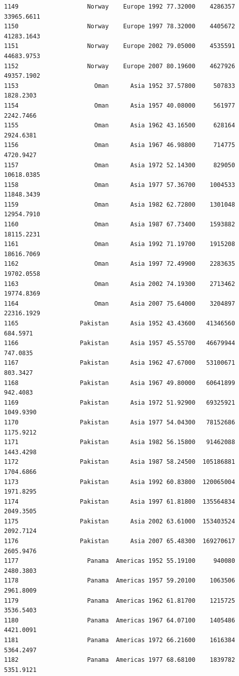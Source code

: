 \documentclass[
  letterpaper,
  DIV=11,
  numbers=noendperiod]{scrreprt}
\begin{document}
\begin{verbatim}
1149                   Norway    Europe 1992 77.32000    4286357  33965.6611
1150                   Norway    Europe 1997 78.32000    4405672  41283.1643
1151                   Norway    Europe 2002 79.05000    4535591  44683.9753
1152                   Norway    Europe 2007 80.19600    4627926  49357.1902
1153                     Oman      Asia 1952 37.57800     507833   1828.2303
1154                     Oman      Asia 1957 40.08000     561977   2242.7466
1155                     Oman      Asia 1962 43.16500     628164   2924.6381
1156                     Oman      Asia 1967 46.98800     714775   4720.9427
1157                     Oman      Asia 1972 52.14300     829050  10618.0385
1158                     Oman      Asia 1977 57.36700    1004533  11848.3439
1159                     Oman      Asia 1982 62.72800    1301048  12954.7910
1160                     Oman      Asia 1987 67.73400    1593882  18115.2231
1161                     Oman      Asia 1992 71.19700    1915208  18616.7069
1162                     Oman      Asia 1997 72.49900    2283635  19702.0558
1163                     Oman      Asia 2002 74.19300    2713462  19774.8369
1164                     Oman      Asia 2007 75.64000    3204897  22316.1929
1165                 Pakistan      Asia 1952 43.43600   41346560    684.5971
1166                 Pakistan      Asia 1957 45.55700   46679944    747.0835
1167                 Pakistan      Asia 1962 47.67000   53100671    803.3427
1168                 Pakistan      Asia 1967 49.80000   60641899    942.4083
1169                 Pakistan      Asia 1972 51.92900   69325921   1049.9390
1170                 Pakistan      Asia 1977 54.04300   78152686   1175.9212
1171                 Pakistan      Asia 1982 56.15800   91462088   1443.4298
1172                 Pakistan      Asia 1987 58.24500  105186881   1704.6866
1173                 Pakistan      Asia 1992 60.83800  120065004   1971.8295
1174                 Pakistan      Asia 1997 61.81800  135564834   2049.3505
1175                 Pakistan      Asia 2002 63.61000  153403524   2092.7124
1176                 Pakistan      Asia 2007 65.48300  169270617   2605.9476
1177                   Panama  Americas 1952 55.19100     940080   2480.3803
1178                   Panama  Americas 1957 59.20100    1063506   2961.8009
1179                   Panama  Americas 1962 61.81700    1215725   3536.5403
1180                   Panama  Americas 1967 64.07100    1405486   4421.0091
1181                   Panama  Americas 1972 66.21600    1616384   5364.2497
1182                   Panama  Americas 1977 68.68100    1839782   5351.9121

\end{verbatim}
\end{document}
